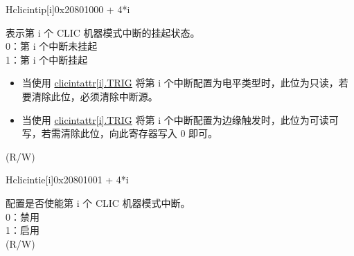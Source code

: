 \begin{register}{H}{{clicintip[i]}}{0x20801000 + 4*i}\label{regdesc:MCLICINTIP_REG_i}
%
%
\regnewline%
\begin{regdesc}
\begin{reglist}
\label{fielddesc:MCLICINTIP_i}\item [{IP[i]}] 表示第 i 个 CLIC 机器模式中断的挂起状态。 \\
0：第 i 个中断未挂起 \\
1：第 i 个中断挂起 \\
\begin{itemize}
    \item 当使用 \hyperref[fielddesc:MCLICINTATTR_i_TRIG]{clicintattr[i].TRIG} 将第 i 个中断配置为电平类型时，此位为只读，若要清除此位，必须清除中断源。
    \item 当使用 \hyperref[fielddesc:MCLICINTATTR_i_TRIG]{clicintattr[i].TRIG} 将第 i 个中断配置为边缘触发时，此位为可读可写，若需清除此位，向此寄存器写入 0 即可。
\end{itemize}
(R/W)
\end{reglist}
\end{regdesc}
\end{register}

\begin{register}{H}{{clicintie[i]}}{0x20801001 + 4*i}\label{regdesc:MCLICINTIE_REG_i}
%
%
\regnewline%
\begin{regdesc}
\begin{reglist}
\label{fielddesc:MCLICINTIE_i}\item [{IE[i]}] 配置是否使能第 i 个 CLIC 机器模式中断。\\
0：禁用 \\
1：启用 \\
(R/W) \\
\end{reglist}
\end{regdesc}
\end{register}

